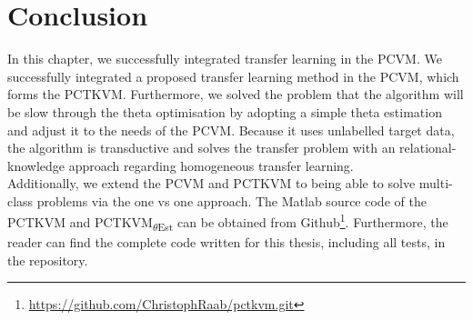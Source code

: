 \section{Conclusion}\label{InSecCon}
In this chapter, we successfully integrated transfer learning in the \acs{PCVM}.
We successfully integrated a proposed transfer learning method in the \acs{PCVM}, which forms the \acs{PCTKVM}.
Furthermore, we solved the problem that the algorithm will be slow through the theta optimisation by adopting a simple theta estimation and adjust it to the needs of the \acs{PCVM}.
Because it uses unlabelled target data, the algorithm is transductive and solves the transfer problem with an relational-knowledge approach regarding homogeneous transfer learning.\\
Additionally, we extend the \acs{PCVM} and \acs{PCTKVM} to being able to solve multi-class problems via the one vs one approach.
The Matlab source code of the \acs{PCTKVM} and \acs{PCTKVM}\textsubscript{$\theta$Est} can be obtained from Github\footnote{\url{https://github.com/ChristophRaab/pctkvm.git}}.
Furthermore, the reader can find the complete code written for this thesis, including all tests, in the repository.
